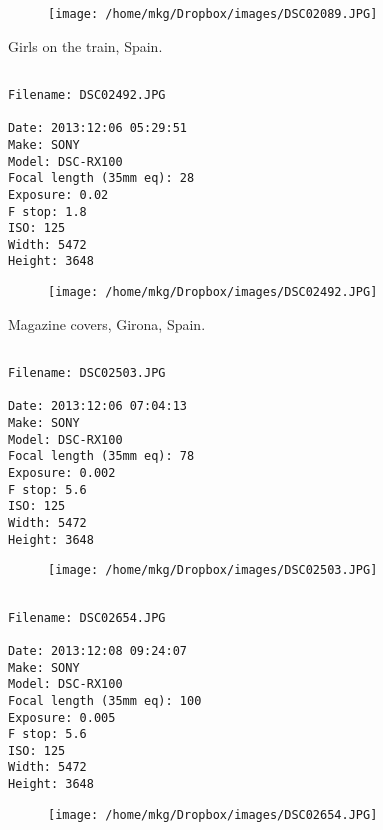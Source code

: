 \begin{figure}
\texttt{[image: /home/mkg/Dropbox/images/DSC02089.JPG]}
\end{figure}
    
\clearpage
\onecolumn
\noindent Girls on the train, Spain.
\noindent
\begin{lstlisting}

Filename: DSC02492.JPG

Date: 2013:12:06 05:29:51
Make: SONY
Model: DSC-RX100
Focal length (35mm eq): 28
Exposure: 0.02
F stop: 1.8
ISO: 125
Width: 5472
Height: 3648
\end{lstlisting}
\clearpage

\begin{figure}
\texttt{[image: /home/mkg/Dropbox/images/DSC02492.JPG]}
\end{figure}
    
\clearpage
\onecolumn
\noindent Magazine covers, Girona, Spain.
\noindent
\begin{lstlisting}

Filename: DSC02503.JPG

Date: 2013:12:06 07:04:13
Make: SONY
Model: DSC-RX100
Focal length (35mm eq): 78
Exposure: 0.002
F stop: 5.6
ISO: 125
Width: 5472
Height: 3648
\end{lstlisting}
\clearpage

\begin{figure}
\texttt{[image: /home/mkg/Dropbox/images/DSC02503.JPG]}
\end{figure}
    
\clearpage
\onecolumn
\noindent 
\noindent
\begin{lstlisting}

Filename: DSC02654.JPG

Date: 2013:12:08 09:24:07
Make: SONY
Model: DSC-RX100
Focal length (35mm eq): 100
Exposure: 0.005
F stop: 5.6
ISO: 125
Width: 5472
Height: 3648
\end{lstlisting}
\clearpage

\begin{figure}
\texttt{[image: /home/mkg/Dropbox/images/DSC02654.JPG]}
\end{figure}
    
